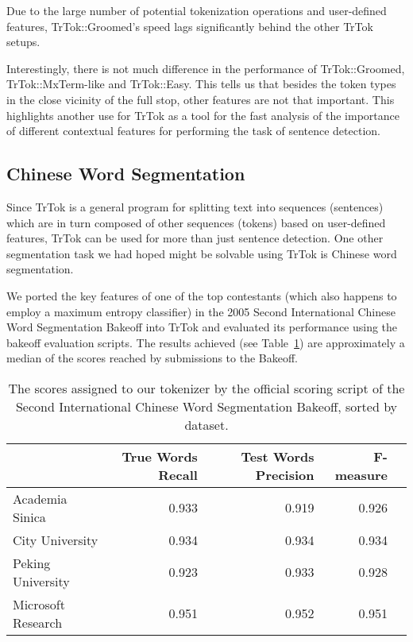 Due to the large number of potential tokenization operations and
user-defined features, TrTok::Groomed's speed lags significantly
behind the other TrTok setups.

Interestingly, there is not much difference in the performance of
TrTok::Groomed, TrTok::MxTerm-like and TrTok::Easy. This tells us that
besides the token types in the close vicinity of the full stop, other
features are not that important. This highlights another use for TrTok
as a tool for the fast analysis of the importance of different
contextual features for performing the task of sentence detection.

\subsection{Chinese Word Segmentation}

Since TrTok is a general program for splitting text into sequences
(sentences) which are in turn composed of other sequences (tokens)
based on user-defined features, TrTok can be used for more than just
sentence detection. One other segmentation task we had hoped might be
solvable using TrTok is Chinese word segmentation.

We ported the key features of one of the top contestants (which also
happens to employ a maximum entropy classifier)
\cite{seg-chinese-maxent} in the 2005 Second International Chinese
Word Segmentation Bakeoff into TrTok and evaluated its performance
using the bakeoff evaluation scripts. The results achieved (see
Table~\ref{tbl:bakeoff-score}) are approximately a median of the
scores reached by submissions to the Bakeoff.

\begin{table}
  \begin{center}
    \begin{tabular}{ | l | r | r | r | r | }
      \hline
      & True Words Recall & Test Words Precision & F-measure \\ \hline
      Academia Sinica & 0.933 & 0.919 & 0.926 \\ \hline
      City University & 0.934 & 0.934 & 0.934 \\ \hline
      Peking University & 0.923 & 0.933 & 0.928 \\ \hline
      Microsoft Research & 0.951 & 0.952 & 0.951 \\
      \hline
    \end{tabular}
  \end{center}
  \caption[Chinese Word Segmentation scores]
    {The scores assigned to our tokenizer by the official scoring script of the
    Second International Chinese Word Segmentation Bakeoff, sorted by dataset.}
  \label{tbl:bakeoff-score}
\end{table}

